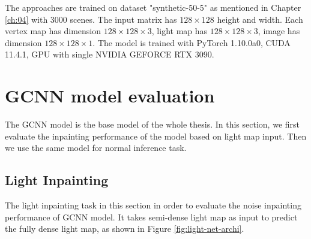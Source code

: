 \documentclass[border=15pt, multi, tikz]{article}
\begin{document}
	
The approaches are trained on dataset "synthetic-50-5" as mentioned in Chapter \ref{ch:04} with 3000 scenes. The input matrix has $ 128\times 128 $ height and width. Each vertex map has dimension $ 128\times 128\times3 $, light map has $ 128\times 128 \times 3 $, image has dimension $ 128\times 128 \times 1 $. The model is trained with PyTorch 1.10.0a0, CUDA 11.4.1, GPU with single NVIDIA GEFORCE RTX 3090.


\section{GCNN model evaluation}
The GCNN model is the base model of the whole thesis. In this section, we first evaluate the inpainting performance of the model based on light map input. Then we use the same model for normal inference task.


\subsection{Light Inpainting}
The light inpainting task in this section in order to evaluate the noise inpainting performance of GCNN model. It takes semi-dense light map as input to predict the fully dense light map, as shown in Figure \ref{fig:light-net-archi}.
\end{document}
